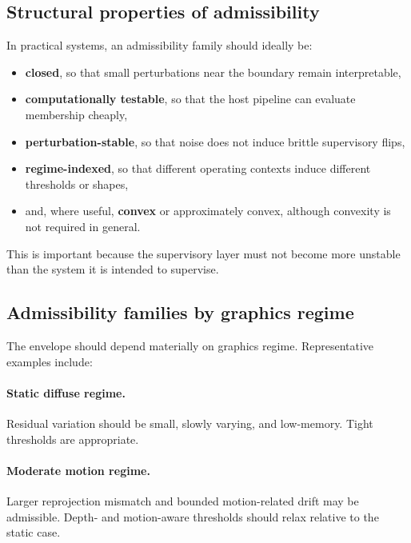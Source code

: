 \documentclass[11pt]{article}
\theoremstyle{definition}
\theoremstyle{plain}
\begin{document}

\subsection{Structural properties of admissibility}

In practical systems, an admissibility family should ideally be:
\begin{itemize}[leftmargin=1.5em]
    \item \textbf{closed}, so that small perturbations near the boundary remain interpretable,
    \item \textbf{computationally testable}, so that the host pipeline can evaluate membership cheaply,
    \item \textbf{perturbation-stable}, so that noise does not induce brittle supervisory flips,
    \item \textbf{regime-indexed}, so that different operating contexts induce different thresholds or shapes,
    \item and, where useful, \textbf{convex} or approximately convex, although convexity is not required in general.
\end{itemize}

This is important because the supervisory layer must not become more unstable than the system it is intended to supervise.


\subsection{Admissibility families by graphics regime}

The envelope should depend materially on graphics regime. Representative examples include:

\paragraph{Static diffuse regime.}
Residual variation should be small, slowly varying, and low-memory. Tight thresholds are appropriate.

\paragraph{Moderate motion regime.}
Larger reprojection mismatch and bounded motion-related drift may be admissible. Depth- and motion-aware thresholds should relax relative to the static case.
\end{document}
